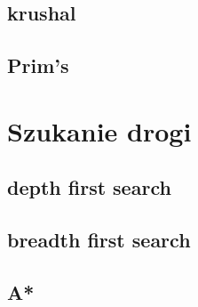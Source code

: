 \documentclass[12pt, a4paper]{article}
\begin{document}
\subsection{krushal}
\subsection{Prim's}

\section{Szukanie drogi}
\subsection{depth first search}
\subsection{breadth first search}
\subsection{A*}
\end{document}
